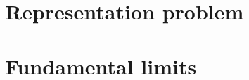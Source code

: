 \documentclass[]{book}    %
\begin{document}
\section{Representation problem}
\section{Fundamental limits}




\backmatter 
\end{document}
